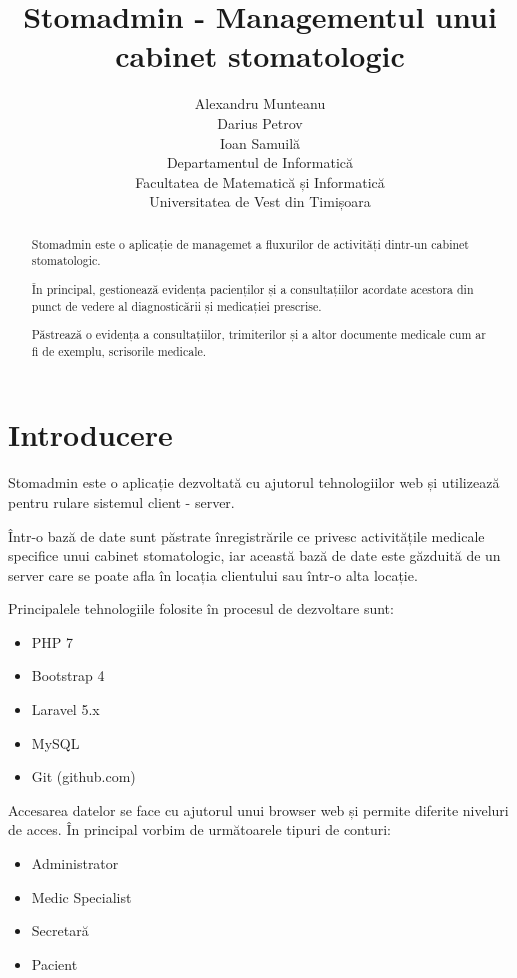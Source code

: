 \documentclass[a4paper,12pt]{article}
\title{Stomadmin - Managementul unui cabinet stomatologic}
\author{Alexandru Munteanu\\
Darius Petrov\\
Ioan Samuilă\\
Departamentul de Informatică\\
Facultatea de Matematică și Informatică\\
Universitatea de Vest din Timișoara}
\date{}
\begin{document}
\maketitle
\begin{abstract}
Stomadmin este o aplicație de managemet a fluxurilor de activități dintr-un cabinet stomatologic.

 În principal, gestionează evidența pacienților și a consultațiilor acordate acestora din punct de vedere al diagnosticării și medicației prescrise. 

Păstrează o evidența a consultațiilor, trimiterilor și a altor documente medicale cum ar fi de exemplu, scrisorile medicale.  
\end{abstract}

\pagebreak

\tableofcontents

\pagebreak

\section{Introducere}

Stomadmin este o aplicație dezvoltată cu ajutorul tehnologiilor web și utilizează pentru rulare sistemul client - server.

Într-o bază de date sunt păstrate înregistrările ce privesc activitățile medicale specifice unui cabinet stomatologic, iar această bază de date este găzduită de un server care se poate afla în locația clientului sau într-o alta locație.

Principalele tehnologiile folosite în procesul de dezvoltare sunt:

\begin{itemize}
\item PHP 7
\item Bootstrap 4
\item Laravel 5.x
\item MySQL
\item Git (github.com)
\end{itemize}

Accesarea datelor se face cu ajutorul unui browser web și permite diferite niveluri de acces. În principal vorbim de următoarele tipuri de conturi:

\begin{itemize}
\item Administrator
\item Medic Specialist
\item Secretară
\item Pacient
\end{itemize} 
\end{document}

